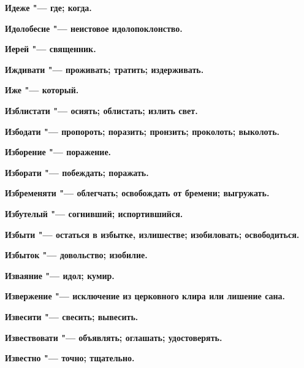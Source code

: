 \begin{mymulticols}{2}
\bfseries Идеже\normalfont{} "--- где; когда. 




\bfseries Идолобесие\normalfont{} "--- неистовое идолопоклонство. 




\bfseries Иерей\normalfont{} "--- священник. 




\bfseries Иждивати\normalfont{} "--- проживать; тратить; издерживать. 




\bfseries Иже\normalfont{} "--- который. 




\bfseries Изблистати\normalfont{} "--- осиять; облистать; излить свет. 




\bfseries Избодати\normalfont{} "--- пропороть; поразить; пронзить; проколоть; выколоть. 




\bfseries Изборение\normalfont{} "--- поражение. 




\bfseries Изборати\normalfont{} "--- побеждать; поражать. 




\bfseries Избременяти\normalfont{} "--- облегчать; освобождать от бремени; выгружать. 




\bfseries Избутелый\normalfont{} "--- согнивший; испортившийся. 




\bfseries Избыти\normalfont{} "--- остаться в избытке, излишестве; изобиловать; освободиться. 




\bfseries Избыток\normalfont{} "--- довольство; изобилие. 




\bfseries Изваяние\normalfont{} "--- идол; кумир. 




\bfseries Извержение\normalfont{} "--- исключение из церковного клира или лишение сана. 




\bfseries Извесити\normalfont{} "--- свесить; вывесить. 




\bfseries Извествовати\normalfont{} "--- объявлять; оглашать; удостоверять. 




\bfseries Известно\normalfont{} "--- точно; тщательно. 





\end{mymulticols}
